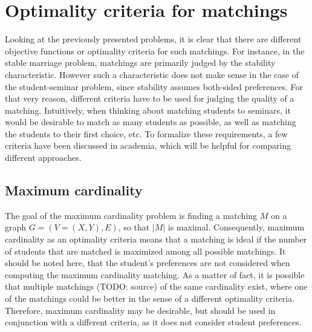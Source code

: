 \section{Optimality criteria for matchings}
Looking at the previously presented problems, it is clear that there are different objective functions or optimality criteria for such matchings. For instance, in the stable marriage problem, matchings are primarily judged by the stability characteristic. However such a characteristic does not make sense in the case of the student-seminar problem, since stability assumes both-sided preferences. For that very reason, different criteria have to be used for judging the quality of a matching.
\newline
Intuitively, when thinking about matching students to seminars, it would be desirable to match as many students as possible, as well as matching the students to their first choice, etc. To formalize these requirements, a few criteria have been discussed in academia, which will be helpful for comparing different approaches. 

\subsection{Maximum cardinality}
The goal of the maximum cardinality problem is finding a matching $M$ on a graph $G=(V=(X, Y), E)$, so that $|M|$ is maximal.\cite{GraphTheoryIntro} Consequently, maximum cardinality as an optimality criteria means that a matching is ideal if the number of students that are matched is maximized among all possible matchings. It should be noted here, that the student's preferences are not considered when computing the maximum cardinality matching. As a matter of fact, it is possible that multiple matchings (TODO: source) of the same cardinality exist, where one of the matchings could be better in the sense of a different optimality criteria. Therefore, maximum cardinality may be desirable, but should be used in conjunction with a different criteria, as it does not consider student preferences.

